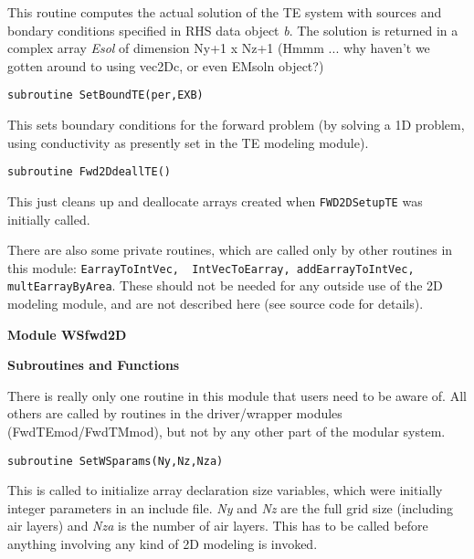 \documentclass[12pt]{article}
\begin{document}
This routine computes the actual solution of the TE system
with sources and bondary conditions specified in RHS data object {\it b}.
The solution is returned in a complex array 
{\it Esol} of dimension Ny+1 x Nz+1
(Hmmm ... why haven't we gotten around to using vec2Dc,
or even EMsoln object?)

\begin{verbatim}
subroutine SetBoundTE(per,EXB)
\end{verbatim}

This sets boundary conditions for the forward problem
(by solving a 1D problem, using conductivity as presently set in
the TE modeling module).

\begin{verbatim}
subroutine Fwd2DdeallTE()
\end{verbatim}

This just cleans up and deallocate arrays created when 
\verb|FWD2DSetupTE| was initially called.

There are also some private routines, which are called only by
other routines in this module: 
\verb|EarrayToIntVec,  IntVecToEarray, addEarrayToIntVec, multEarrayByArea|.  These should not
be needed for any outside use of the 2D modeling module,
and are not described here (see source code for details).

\vspace{10pt}

\noindent
{\bf Module WSfwd2D}

\vspace{10pt}

\noindent
{\bf Subroutines and Functions}

\vspace{6pt}

There is really only one routine in this module that users need
to be aware of.  All others are called by routines in the driver/wrapper
modules (FwdTEmod/FwdTMmod), but not by any other part of the modular system.

\begin{verbatim}
subroutine SetWSparams(Ny,Nz,Nza)
\end{verbatim}

This is called to initialize array declaration size variables,
which were initially integer parameters in an include file.
{\it Ny} and {\it Nz} are the full grid size (including air layers)
and {\it Nza} is the number of air layers.  This has to be
called before anything involving any kind of 2D modeling
is invoked. 
\end{document}

